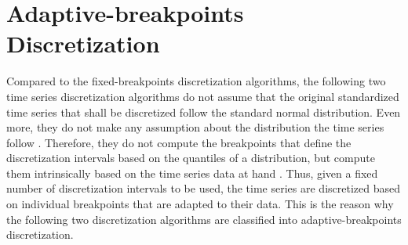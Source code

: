 \section{Adaptive-breakpoints Discretization}
Compared to the fixed-breakpoints discretization algorithms, the following two time series discretization algorithms do not assume that the original standardized time series that shall be discretized follow the standard normal distribution. Even more, they do not make any assumption about the distribution the time series follow \cite{A_SAX, Persist}. Therefore, they do not compute the breakpoints that define the discretization intervals based on the quantiles of a distribution, but compute them intrinsically based on the time series data at hand \cite{A_SAX, Persist}. Thus, given a fixed number of discretization intervals to be used, the time series are discretized based on individual breakpoints that are adapted to their data. This is the reason why the following two discretization algorithms are classified into adaptive-breakpoints discretization.









